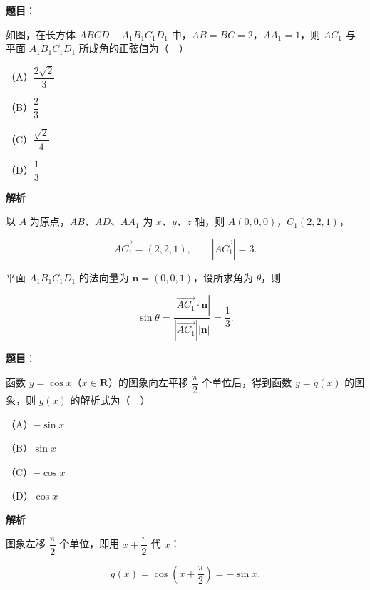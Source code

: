 \begin{answer}

\textbf{题目}：

如图，在长方体 $ABCD-A_1B_1C_1D_1$ 中，$AB=BC=2$，$AA_1=1$，则 $AC_1$ 与平面 $A_1B_1C_1D_1$ 所成角的正弦值为（　）

（A）$\dfrac{2\sqrt2}{3}$

（B）$\dfrac23$

（C）$\dfrac{\sqrt2}{4}$

（D）$\dfrac13$
\nopagebreak[4]
\begin{center}\end{center}
\nopagebreak[4]
\textbf{解析}

以 $A$ 为原点，$AB$、$AD$、$AA_1$ 为 $x$、$y$、$z$ 轴，则 $A(0,0,0)$，$C_1(2,2,1)$，

\nopagebreak[4]
\[\overrightarrow{AC_1}=(2,2,1),\qquad |\overrightarrow{AC_1}|=3.\]

平面 $A_1B_1C_1D_1$ 的法向量为 $\boldsymbol n=(0,0,1)$，设所求角为 $\theta$，则

\nopagebreak[4]
\[\sin\theta=\frac{|\overrightarrow{AC_1}\cdot\boldsymbol n|}{|\overrightarrow{AC_1}||\boldsymbol n|}=\frac13.\]


\end{answer}
\begin{answer}

\textbf{题目}：

函数 $y=\cos x$（$x\in\mathbf R$）的图象向左平移 $\dfrac{\pi}{2}$ 个单位后，得到函数 $y=g(x)$ 的图象，则 $g(x)$ 的解析式为（　）

（A）$-\sin x$

（B）$\sin x$

（C）$-\cos x$

（D）$\cos x$

\textbf{解析}

图象左移 $\dfrac{\pi}2$ 个单位，即用 $x+\dfrac{\pi}2$ 代 $x$：

\nopagebreak[4]
\[g(x)=\cos\left(x+\frac{\pi}2\right)=-\sin x.\]


\end{answer}

